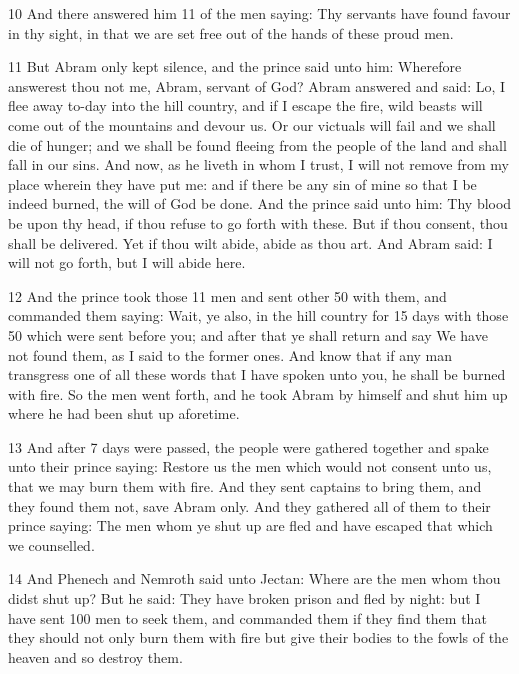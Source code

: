 \par 10 And there answered him 11 of the men saying: Thy servants have found favour in thy sight, in that we are set free out of the hands of these proud men. 

\par 11 But Abram only kept silence, and the prince said unto him: Wherefore answerest thou not me, Abram, servant of God? Abram answered and said: Lo, I flee away to-day into the hill country, and if I escape the fire, wild beasts will come out of the mountains and devour us. Or our victuals will fail and we shall die of hunger; and we shall be found fleeing from the people of the land and shall fall in our sins. And now, as he liveth in whom I trust, I will not remove from my place wherein they have put me: and if there be any sin of mine so that I be indeed burned, the will of God be done. And the prince said unto him: Thy blood be upon thy head, if thou refuse to go forth with these. But if thou consent, thou shall be delivered. Yet if thou wilt abide, abide as thou art. And Abram said: I will not go forth, but I will abide here.

\par 12 And the prince took those 11 men and sent other 50 with them, and commanded them saying: Wait, ye also, in the hill country for 15 days with those 50 which were sent before you; and after that ye shall return and say We have not found them, as I said to the former ones. And know that if any man transgress one of all these words that I have spoken unto you, he shall be burned with fire. So the men went forth, and he took Abram by himself and shut him up where he had been shut up aforetime.

\par 13 And after 7 days were passed, the people were gathered together and spake unto their prince saying: Restore us the men which would not consent unto us, that we may burn them with fire. And they sent captains to bring them, and they found them not, save Abram only. And they gathered all of them to their prince saying: The men whom ye shut up are fled and have escaped that which we counselled. 

\par 14 And Phenech and Nemroth said unto Jectan: Where are the men whom thou didst shut up? But he said: They have broken prison and fled by night: but I have sent 100 men to seek them, and commanded them if they find them that they should not only burn them with fire but give their bodies to the fowls of the heaven and so destroy them. 


